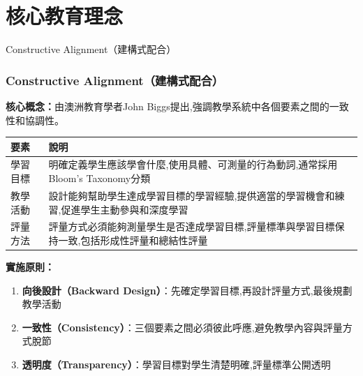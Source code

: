 \documentclass[aspectratio=169]{beamer}
\newcommand{\contentsize}{\fontsize{9pt}{11pt}\selectfont}
\newcommand{\tablesize}{\fontsize{7.5pt}{9pt}\selectfont}
\begin{document}
\section{核心教育理念}

\begin{frame}{Constructive Alignment（建構式配合）}
\frametitle{Constructive Alignment（建構式配合）}
\contentsize

\textbf{核心概念：}由澳洲教育學者John Biggs提出,強調教學系統中各個要素之間的一致性和協調性。

\vspace{0.3cm}

\begin{table}[h]
\centering
\tablesize
\begin{tabular}{p{2.8cm}p{8.5cm}}
\toprule
\textbf{要素} & \textbf{說明} \\
\midrule
學習目標 & 明確定義學生應該學會什麼,使用具體、可測量的行為動詞,通常採用Bloom's Taxonomy分類 \\
\midrule
教學活動 & 設計能夠幫助學生達成學習目標的學習經驗,提供適當的學習機會和練習,促進學生主動參與和深度學習 \\
\midrule
評量方法 & 評量方式必須能夠測量學生是否達成學習目標,評量標準與學習目標保持一致,包括形成性評量和總結性評量 \\
\bottomrule
\end{tabular}
\end{table}

\vspace{0.3cm}

\textbf{實施原則：}
\begin{enumerate}
    \item \textbf{向後設計（Backward Design）}：先確定學習目標,再設計評量方式,最後規劃教學活動
    \item \textbf{一致性（Consistency）}：三個要素之間必須彼此呼應,避免教學內容與評量方式脫節
    \item \textbf{透明度（Transparency）}：學習目標對學生清楚明確,評量標準公開透明
\end{enumerate}
\end{frame}
\end{document}
